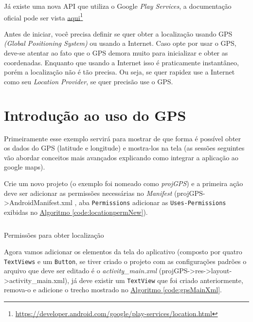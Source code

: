 \documentclass[a4paper,12pt,brazil,oneside]{book}
\begin{document}
		Já existe uma nova API que utiliza o Google \emph{Play Services}, a documentação oficial pode ser vista \href{https://developer.android.com/google/play-services/location.html}{aqui}\footnote{\href{https://developer.android.com/google/play-services/location.html}{https://developer.android.com/google/play-services/location.html}}

Antes de iniciar, você precisa definir se quer obter a localização usando GPS \emph{(Global Positioning System)} ou usando a Internet. Caso opte por usar o GPS, deve-se atentar ao fato que o GPS demora muito para inicializar e obter as coordenadas. Enquanto que usando a Internet isso é praticamente instantâneo, porém a localização não é tão precisa. Ou seja, se quer rapidez use a Internet como seu \emph{Location Provider}, se quer precisão use o GPS.

\newpage
		\section{Introdução ao uso do GPS}
		
		Primeiramente esse exemplo servirá para mostrar de que forma é possível obter os dados do GPS (latitude e longitude) e mostra-los na tela (as sessões seguintes vão abordar conceitos mais avançados explicando como integrar a aplicação ao google maps).
		
		Crie um novo projeto (o exemplo foi nomeado como \emph{projGPS}) e a primeira ação deve ser adicionar as permissões necessárias no \emph{Manifest} (projGPS->AndroidManifest.xml , aba \texttt{Permissions} adicionar as \texttt{Uses-Permissions} exibidas no \hyperref[code:locationpermNew]{Algoritmo \ref*{code:locationpermNew}}).

		\begin{listing}[H]
		\inputminted[linenos=true,fontsize=\small,frame=lines, framesep=2mm, tabsize=2,numbersep=5pt]{xml}{src/api/maps/perm1.xml}
		\caption{Permissões para obter localização}
		\label{code:locationpermNew}
		\end{listing} 

		Agora vamos adicionar os elementos da tela do aplicativo (composto por quatro \texttt{TextViews} e um \texttt{Button}, se tiver criado o projeto com as configurações padrões o arquivo que deve ser editado é o \emph{activity\_main.xml} (projGPS->res->layout->activity\_main.xml), já deve existir um \texttt{TextView} que foi criado anteriormente, remova-o e adicione o trecho mostrado no \hyperref[code:gpsMainXml]{Algoritmo \ref*{code:gpsMainXml}}.
		
\end{document}
